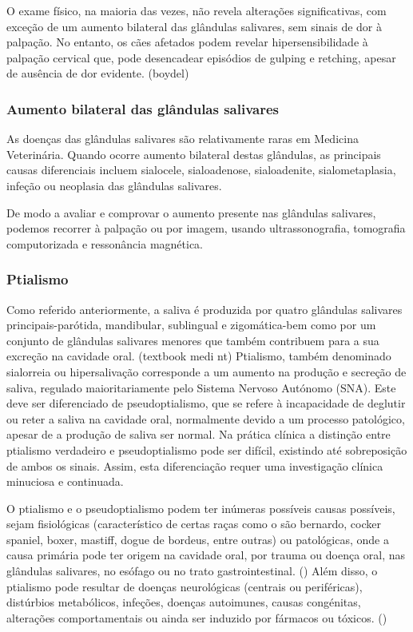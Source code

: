 O exame físico, na maioria das vezes, não revela alterações significativas, com exceção de um aumento bilateral das glândulas salivares, sem sinais de dor à palpação. No entanto, os cães afetados podem revelar hipersensibilidade à palpação cervical que, pode desencadear episódios de gulping e retching, apesar de ausência de dor evidente. (boydel)

\subsubsection{Aumento bilateral das glândulas salivares} 

As doenças das glândulas salivares são relativamente raras em Medicina Veterinária. Quando ocorre aumento bilateral destas glândulas, as principais causas diferenciais incluem sialocele, sialoadenose, sialoadenite, sialometaplasia, infeção ou neoplasia das glândulas salivares.


De modo a avaliar e comprovar o aumento presente nas glândulas salivares, podemos recorrer à palpação ou por imagem, usando ultrassonografia, tomografia computorizada e ressonância magnética.

\subsubsection{Ptialismo} 

Como referido anteriormente, a saliva é produzida por quatro glândulas salivares principais-parótida, mandibular, sublingual e zigomática-bem como por um conjunto de glândulas salivares menores que também contribuem para a sua excreção na cavidade oral. (textbook medi nt)
Ptialismo, também denominado sialorreia ou hipersalivação corresponde a um aumento na produção e secreção de saliva, regulado maioritariamente pelo Sistema Nervoso Autónomo (SNA). Este deve ser diferenciado de pseudoptialismo, que se refere à incapacidade de deglutir ou reter a saliva na cavidade oral, normalmente devido a um processo patológico, apesar de a produção de saliva ser normal.
 Na prática clínica a distinção entre ptialismo verdadeiro e pseudoptialismo pode ser difícil, existindo até sobreposição de ambos os sinais. Assim, esta diferenciação requer uma investigação clínica minuciosa e continuada. \cite{bsava_2020_gastro}


O ptialismo e o pseudoptialismo podem ter inúmeras possíveis causas possíveis, sejam fisiológicas (característico de certas raças como o são bernardo, cocker spaniel, boxer, mastiff, dogue de bordeus, entre outras) \cite{_canine_gastro_2013} ou patológicas, onde a causa primária pode ter origem na cavidade oral, por trauma ou doença oral, \cite{_canine_gastro_2013}nas glândulas salivares, no esófago ou no trato gastrointestinal. (\cite{Kook2013}) Além disso, o ptialismo pode resultar de doenças neurológicas (centrais ou periféricas), distúrbios metabólicos, infeções, doenças autoimunes, causas congénitas, alterações comportamentais ou ainda ser induzido por fármacos ou tóxicos. (\cite{Kook2013}) 


